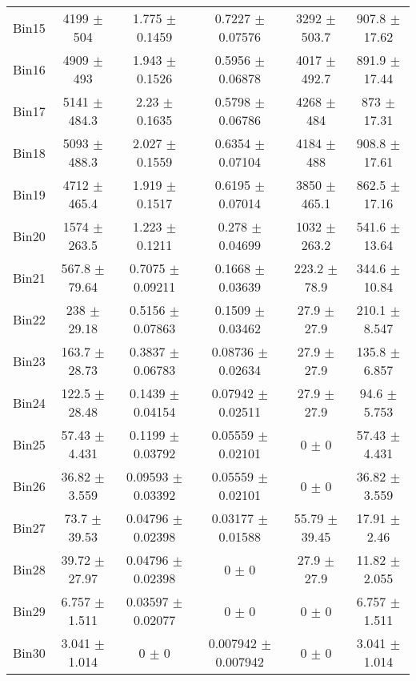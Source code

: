 \begin{tabular}{@{\extracolsep{4pt}}lccccc@{}}
     Bin15 & 4199 $\pm$ 504 & 1.775 $\pm$ 0.1459 & 0.7227 $\pm$ 0.07576 & 3292 $\pm$ 503.7 & 907.8 $\pm$ 17.62 \\ 
     Bin16 & 4909 $\pm$ 493 & 1.943 $\pm$ 0.1526 & 0.5956 $\pm$ 0.06878 & 4017 $\pm$ 492.7 & 891.9 $\pm$ 17.44 \\ 
     Bin17 & 5141 $\pm$ 484.3 & 2.23 $\pm$ 0.1635 & 0.5798 $\pm$ 0.06786 & 4268 $\pm$ 484 & 873 $\pm$ 17.31 \\ 
     Bin18 & 5093 $\pm$ 488.3 & 2.027 $\pm$ 0.1559 & 0.6354 $\pm$ 0.07104 & 4184 $\pm$ 488 & 908.8 $\pm$ 17.61 \\ 
     Bin19 & 4712 $\pm$ 465.4 & 1.919 $\pm$ 0.1517 & 0.6195 $\pm$ 0.07014 & 3850 $\pm$ 465.1 & 862.5 $\pm$ 17.16 \\ 
     Bin20 & 1574 $\pm$ 263.5 & 1.223 $\pm$ 0.1211 & 0.278 $\pm$ 0.04699 & 1032 $\pm$ 263.2 & 541.6 $\pm$ 13.64 \\ 
     Bin21 & 567.8 $\pm$ 79.64 & 0.7075 $\pm$ 0.09211 & 0.1668 $\pm$ 0.03639 & 223.2 $\pm$ 78.9 & 344.6 $\pm$ 10.84 \\ 
     Bin22 & 238 $\pm$ 29.18 & 0.5156 $\pm$ 0.07863 & 0.1509 $\pm$ 0.03462 & 27.9 $\pm$ 27.9 & 210.1 $\pm$ 8.547 \\ 
     Bin23 & 163.7 $\pm$ 28.73 & 0.3837 $\pm$ 0.06783 & 0.08736 $\pm$ 0.02634 & 27.9 $\pm$ 27.9 & 135.8 $\pm$ 6.857 \\ 
     Bin24 & 122.5 $\pm$ 28.48 & 0.1439 $\pm$ 0.04154 & 0.07942 $\pm$ 0.02511 & 27.9 $\pm$ 27.9 & 94.6 $\pm$ 5.753 \\ 
     Bin25 & 57.43 $\pm$ 4.431 & 0.1199 $\pm$ 0.03792 & 0.05559 $\pm$ 0.02101 & 0 $\pm$ 0 & 57.43 $\pm$ 4.431 \\ 
     Bin26 & 36.82 $\pm$ 3.559 & 0.09593 $\pm$ 0.03392 & 0.05559 $\pm$ 0.02101 & 0 $\pm$ 0 & 36.82 $\pm$ 3.559 \\ 
     Bin27 & 73.7 $\pm$ 39.53 & 0.04796 $\pm$ 0.02398 & 0.03177 $\pm$ 0.01588 & 55.79 $\pm$ 39.45 & 17.91 $\pm$ 2.46 \\ 
     Bin28 & 39.72 $\pm$ 27.97 & 0.04796 $\pm$ 0.02398 & 0 $\pm$ 0 & 27.9 $\pm$ 27.9 & 11.82 $\pm$ 2.055 \\ 
     Bin29 & 6.757 $\pm$ 1.511 & 0.03597 $\pm$ 0.02077 & 0 $\pm$ 0 & 0 $\pm$ 0 & 6.757 $\pm$ 1.511 \\ 
     Bin30 & 3.041 $\pm$ 1.014 & 0 $\pm$ 0 & 0.007942 $\pm$ 0.007942 & 0 $\pm$ 0 & 3.041 $\pm$ 1.014 \\ 
\hline\hline
  \end{tabular}
